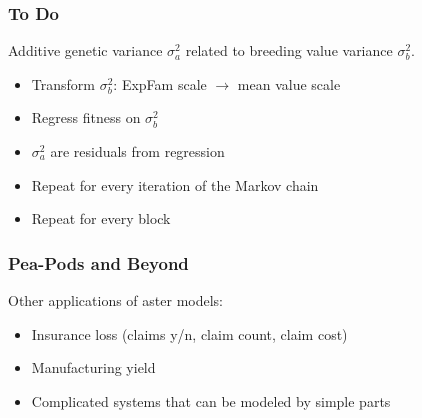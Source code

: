 \documentclass[table]{beamer}
\begin{document}
\begin{frame}
  \frametitle{To Do}
    Additive genetic variance $\sigma^2_a$ related to breeding value variance
    $\sigma^2_b$.
    \begin{itemize}
      \item Transform $\sigma^2_b$: ExpFam scale $\rightarrow$  mean value scale
      \item Regress fitness on $\sigma_b^2$
      \item $\sigma^2_a$ are residuals from regression
      \item Repeat for every iteration of the Markov chain
      \item Repeat for every block
    \end{itemize}
\end{frame}

\begin{frame}
  \frametitle{Pea-Pods and Beyond}
  Other applications of aster models:
  \begin{itemize}
    \item Insurance loss (claims y/n, claim count, claim cost)
    \item Manufacturing yield
    \item Complicated systems that can be modeled by simple parts
  \end{itemize}
\end{frame}
\end{document}
